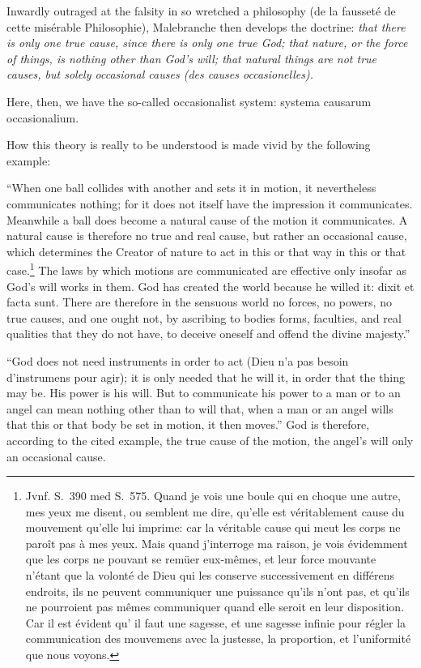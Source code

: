 \documentclass[12pt,a4paper]{article}
\begin{document}
Inwardly outraged at the falsity in so wretched a philosophy (de la fausseté de
cette misérable Philosophie), Malebranche then develops the doctrine: \emph{that
there is only one true cause, since there is only one true God; that nature, or the
force of things, is nothing other than God's will; that natural things are not true
causes, but solely occasional causes (des causes occasionelles).}

Here, then, we have the so-called occasionalist system: systema causarum
occasionalium.

How this theory is really to be understood is made vivid by the following example:

``When one ball collides with another and sets it in motion, it nevertheless
communicates nothing; for it does not itself have the impression it communicates.
Meanwhile a ball does become a natural cause of the motion it communicates. A
natural cause is therefore no true and real cause, but rather an occasional cause,
which determines the Creator of nature to act in this or that way in this or that
case.\footnote{Jvnf. S.~390 med S.~575. Quand je vois une boule qui en choque une
autre, mes yeux me disent, ou semblent me dire, qu'elle est véritablement cause du
mouvement qu'elle lui imprime: car la véritable cause qui meut les corps ne paroît
pas à mes yeux. Mais quand j'interroge ma raison, je vois évidemment que les corps
ne pouvant se remüer eux-mêmes, et leur force mouvante n'étant que la volonté de
Dieu qui les conserve successivement en différens endroits, ils ne peuvent
communiquer une puissance qu'ils n'ont pas, et qu'ils ne pourroient pas mêmes
communiquer quand elle seroit en leur disposition. Car il est évident qu' il faut
une sagesse, et une sagesse infinie pour régler la communication des mouvemens
avec la justesse, la proportion, et l'uniformité que nous voyons.} The laws by
which motions are communicated are effective only insofar as God's will works in
them. God has created the world because he willed it: dixit et facta sunt. There
are therefore in the sensuous world no forces, no powers, no true causes, and one
ought not, by ascribing to bodies forms, faculties, and real qualities that they
do not have, to deceive oneself and offend the divine majesty.''

``God does not need instruments in order to act (Dieu n'a pas besoin d'instrumens
pour agir); it is only needed that he will it, in order that the thing may be. His
power is his will. But to communicate his power to a man or to an angel can mean
nothing other than to will that, when a man or an angel wills that this or that
body be set in motion, it then moves.''
God is therefore, according to the cited example, the true cause of the motion,
the angel's will only an occasional cause.
\end{document}
